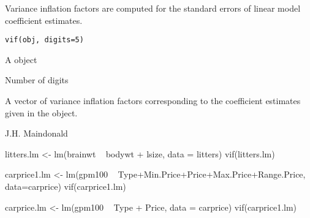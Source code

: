\begin{Description}\relax
Variance inflation factors are computed for the standard
errors of linear model coefficient estimates.
\end{Description}
\begin{Usage}
\begin{verbatim}
vif(obj, digits=5)
\end{verbatim}
\end{Usage}
\begin{Arguments}
\begin{ldescription}
\item[\code{obj}] A  object 
\item[\code{digits}] Number of digits
\end{ldescription}
\end{Arguments}
\begin{Value}
A vector of variance inflation factors corresponding to 
the coefficient estimates given in the  object.
\end{Value}
\begin{Author}\relax
J.H. Maindonald
\end{Author}
\begin{SeeAlso}\relax
{}
\end{SeeAlso}
\begin{Examples}
\begin{ExampleCode}
litters.lm <- lm(brainwt ~ bodywt + lsize, data = litters)
vif(litters.lm)

carprice1.lm <- lm(gpm100 ~ Type+Min.Price+Price+Max.Price+Range.Price,
    data=carprice)
vif(carprice1.lm)

carprice.lm <- lm(gpm100 ~ Type + Price, data = carprice)
vif(carprice1.lm)

\end{ExampleCode}
\end{Examples}

